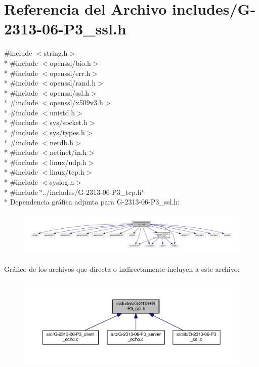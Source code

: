 \hypertarget{G-2313-06-P3__ssl_8h}{}\section{Referencia del Archivo includes/\+G-\/2313-\/06-\/\+P3\+\_\+ssl.h}
\label{G-2313-06-P3__ssl_8h}
{\ttfamily \#include $<$string.\+h$>$}\\*
{\ttfamily \#include $<$openssl/bio.\+h$>$}\\*
{\ttfamily \#include $<$openssl/err.\+h$>$}\\*
{\ttfamily \#include $<$openssl/rand.\+h$>$}\\*
{\ttfamily \#include $<$openssl/ssl.\+h$>$}\\*
{\ttfamily \#include $<$openssl/x509v3.\+h$>$}\\*
{\ttfamily \#include $<$unistd.\+h$>$}\\*
{\ttfamily \#include $<$sys/socket.\+h$>$}\\*
{\ttfamily \#include $<$sys/types.\+h$>$}\\*
{\ttfamily \#include $<$netdb.\+h$>$}\\*
{\ttfamily \#include $<$netinet/in.\+h$>$}\\*
{\ttfamily \#include $<$linux/udp.\+h$>$}\\*
{\ttfamily \#include $<$linux/tcp.\+h$>$}\\*
{\ttfamily \#include $<$syslog.\+h$>$}\\*
{\ttfamily \#include \char`\"{}../includes/\+G-\/2313-\/06-\/\+P3\+\_\+tcp.\+h\char`\"{}}\\*
Dependencia gráfica adjunta para G-\/2313-\/06-\/\+P3\+\_\+ssl.h\+:
\nopagebreak
\begin{figure}[H]
\begin{center}
\leavevmode
\includegraphics[width=350pt]{G-2313-06-P3__ssl_8h__incl}
\end{center}
\end{figure}
Gráfico de los archivos que directa o indirectamente incluyen a este archivo\+:
\nopagebreak
\begin{figure}[H]
\begin{center}
\leavevmode
\includegraphics[width=350pt]{G-2313-06-P3__ssl_8h__dep__incl}
\end{center}
\end{figure}
